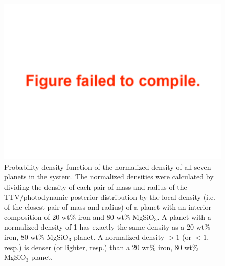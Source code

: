 \documentclass[twocolumn]{aastex63}
\begin{document}
\begin{figure}
    \centering
    \includegraphics[width=\hsize]{figures/plot_normalized_density_agol_et_al.pdf}
    {Probability density function of the normalized density of all seven planets in the system.
        The normalized densities were calculated by dividing the density of each pair of mass and radius of the TTV/photodynamic posterior distribution by the local density (i.e. of the closest pair of mass and radius) of a planet with an interior composition of 20 wt\% iron and 80 wt\% MgSiO$_3$. A planet with a normalized density of 1 has exactly the same density as a 20 wt\% iron, 80 wt\% MgSiO$_3$ planet. A normalized density ${>}1$ (or ${<}1$, resp.) is denser (or lighter, resp.) than a 20 wt\% iron, 80 wt\% MgSiO$_3$ planet.}
    \label{fig:norm_density_histo}
\end{figure}
\end{document}
